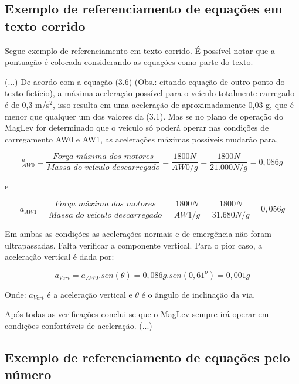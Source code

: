 \documentclass[
        oneside,      %
        english,			
        brazil			 
        ]{configcefetmglpd}
\begin{document}
\subsection{Exemplo de referenciamento de equações em texto corrido} \label{subsec:refer_eq_texto_corrido}
Segue exemplo de referenciamento em texto corrido. É possível notar que a pontuação é colocada considerando as equações como parte do texto.

(...) De acordo com a equação (3.6) (Obs.: citando equação de outro ponto do texto fictício), a máxima aceleração possível para o veículo totalmente carregado é de 0,3 m/s$^2$, isso resulta em uma aceleração de aproximadamente 0,03 g, que é menor que qualquer um dos valores da (3.1). Mas se no plano de operação do MagLev for determinado que o veículo só poderá operar nas condições de carregamento AW0 e AW1, as acelerações máximas possíveis mudarão para,

\begin{equation}
	\label{eq:Aw0}
^	a_{AW0} = \frac{\textit{Força~máxima~dos~motores}}{\textit{Massa~do~veículo~descarregado}} = \frac{1800N}{AW0/g}
	=\frac{1800N}{21.000N/g}=0,086g
\end{equation}

e

\begin{equation}
	\label{eq:Aw1}
	a_{AW1} = \frac{\textit{Força~máxima~dos~motores}}{\textit{Massa~do~veículo~descarregado}} = \frac{1800N}{AW1/g}
	=\frac{1800N}{31.680N/g}=0,056g
\end{equation}

Em ambas as condições as acelerações normais e de emergência não foram ultrapassadas. Falta verificar a componente vertical. Para o pior caso, a aceleração vertical é dada por:

\begin{equation}
	\label{eq:Avert}
	a_{Vert} = a_{AW0}.sen(\theta)=0,086g.sen(0,61^o)=0,001g
\end{equation}

Onde: $a_{Vert}$ é a aceleração vertical e $\theta$ é o ângulo de inclinação da via.

Após todas as verificações conclui-se que o MagLev sempre irá operar em condições confortáveis de aceleração. (...)

\subsection{Exemplo de referenciamento de equações pelo número} \label{subsec:eq_ref_numero}
\end{document}
